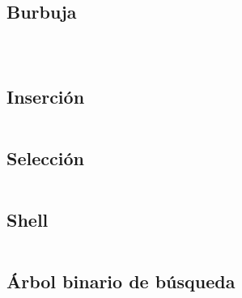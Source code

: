 \documentclass[12pt, fleqn]{report}                             %
\theoremstyle{break}                                            %
\begin{document}
	    \subsection{Burbuja}
	        \inputminted[breaklines, linenos, tabsize=4, fontsize=\footnotesize, firstline=29, lastline=36, firstnumber=1]{c}{code/BubbleSort.c}
	        
	        \inputminted[breaklines, linenos, tabsize=4, fontsize=\footnotesize, firstline=49, lastline=56, firstnumber=1]{c}{code/BubbleSort.c}
	        
	        \inputminted[breaklines, linenos, tabsize=4, fontsize=\footnotesize, firstline=68, lastline=82, firstnumber=1]{c}{code/BubbleSort.c}
	    
	    \subsection{Inserción}
	        \inputminted[breaklines, linenos, tabsize=4, fontsize=\footnotesize, firstline=30, lastline=44, firstnumber=1]{c}{code/InsertionSort.c}
	        
	    \subsection{Selección}
	        \inputminted[breaklines, linenos, tabsize=4, fontsize=\footnotesize, firstline=29, lastline=39, firstnumber=1]{c}{code/SelectionSort.c}
	        
	    \subsection{Shell}
	        \inputminted[breaklines, linenos, tabsize=4, fontsize=\footnotesize, firstline=33, lastline=53, firstnumber=1]{c}{code/ShellSort.c}
	        
	    \subsection{Árbol binario de búsqueda}
	        \inputminted[breaklines, linenos, tabsize=4, fontsize=\footnotesize, firstline=16, lastline=22, firstnumber=1]{c}{code/TreeAuxFunction.c}
	        
	        \inputminted[breaklines, linenos, tabsize=4, fontsize=\footnotesize, firstline=37, lastline=43, firstnumber=1]{c}{code/TreeAuxFunction.c}
	        
	        \inputminted[breaklines, linenos, tabsize=4, fontsize=\footnotesize, firstline=58, lastline=66, firstnumber=1]{c}{code/TreeAuxFunction.c}
	        
\end{document}
